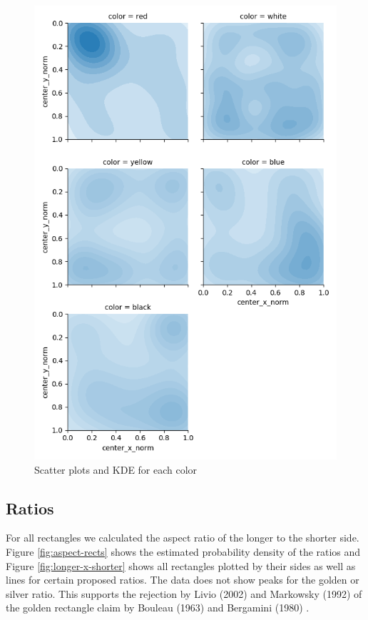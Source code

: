 \documentclass[serif,article,noparskip]{agse-thesis}
\begin{document}
\begin{figure}
\includegraphics[width=\linewidth]{images/kernel-densities.png}
\caption{Scatter plots and KDE for each color}
\label{fig:kde}
\end{figure}

\subsection{Ratios} \label{ratios}

For all rectangles we calculated the aspect ratio of the longer to the shorter
side. Figure \ref{fig:aspect-rects} shows the estimated probability density of
the ratios and Figure \ref{fig:longer-x-shorter} shows all rectangles plotted by
their sides as well as lines for certain proposed ratios. The data does not show
peaks for the golden or silver ratio. This supports the rejection by Livio
(2002) \cite{Livio2002} and Markowsky (1992) \cite{Markowsky1992} of the golden
rectangle claim by Bouleau (1963) \cite{bouleau1963} and Bergamini (1980)
\cite{bergamini1980}.
\end{document}
